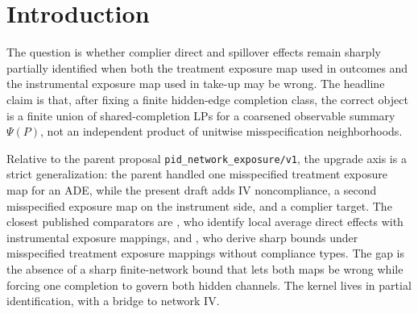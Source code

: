 \documentclass[11pt]{article}
\newcommand{\PsiObs}{\Psi}
\theoremstyle{definition}
\theoremstyle{plain}
\theoremstyle{remark}
\begin{document}
\begin{abstract}
This draft upgrades the banked parent \texttt{pid\_network\_exposure/v1} from
one misspecified treatment exposure map to IV noncompliance with misspecified
treatment and instrumental exposure maps. The routine part is a sharpness
theorem for the summary \(\PsiObs(P)\): the complier direct-effect identified
set is a finite union of linear-fractional LP projections, one for each shared
graph completion, over monotone take-up types and bounded latent mean outcomes. The open
kernel is whether the corresponding product relaxation that chooses each unit's
dual exposure errors in isolation is strictly nonsharp once one graph must
jointly govern both take-up spillovers and outcome spillovers. A positive
answer would bridge the exposure-mapping robustness literature
\citep{Savje2024,SchroderOprescuFeuerriegelKallus2026} with the network-IV
noncompliance literature \citep{HoshinoYanagi2024,ImaiJiangMalani2021}. It
would also produce a computable finite-network bound and a worked witness that
pin down exactly where cellwise robustness loses sharpness.
\end{abstract}

\section{Introduction}
The question is whether complier direct and spillover effects remain sharply
partially identified when both the treatment exposure map used in outcomes and
the instrumental exposure map used in take-up may be wrong. The headline claim
is that, after fixing a finite hidden-edge completion class, the correct object
is a finite union of shared-completion LPs for a coarsened observable summary
\(\PsiObs(P)\), not an independent product of unitwise misspecification
neighborhoods.

Relative to the parent proposal \texttt{pid\_network\_exposure/v1}, the upgrade
axis is a strict generalization: the parent handled one misspecified treatment
exposure map for an ADE, while the present draft adds IV noncompliance, a
second misspecified exposure map on the instrument side, and a complier target.
The closest published comparators are \citet[§3.2.2]{HoshinoYanagi2024}, who
identify local average direct effects with instrumental exposure mappings, and
\citet[Abstract]{SchroderOprescuFeuerriegelKallus2026}, who derive sharp bounds
under misspecified treatment exposure mappings without compliance types. The
gap is the absence of a sharp finite-network bound that lets both maps be
wrong while forcing one completion to govern both hidden channels. The kernel
lives in partial identification, with a bridge to network IV.
\end{document}
